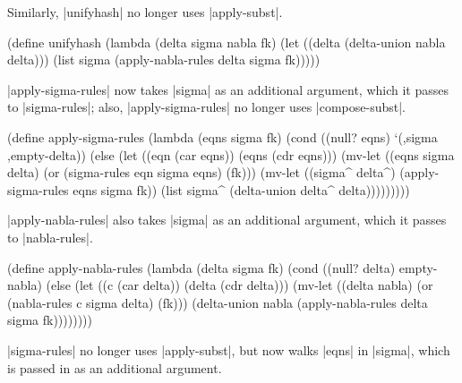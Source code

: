 Similarly, \scheme|unifyhash| no longer uses \scheme|apply-subst|.

\schemedisplayspace
\begin{schemedisplay}
(define unifyhash
  (lambda (delta sigma nabla fk)
    (let ((delta (delta-union nabla delta)))
      (list sigma (apply-nabla-rules delta sigma fk)))))
\end{schemedisplay}

\scheme|apply-sigma-rules| now takes \scheme|sigma| as an additional
argument, which it passes to \scheme|sigma-rules|; also,
\scheme|apply-sigma-rules| no longer uses \scheme|compose-subst|.

\schemedisplayspace
\begin{schemedisplay}
(define apply-sigma-rules
  (lambda (eqns sigma fk)
    (cond
      ((null? eqns) `(,sigma ,empty-delta))
      (else
       (let ((eqn (car eqns)) (eqns (cdr eqns)))
         (mv-let ((eqns sigma delta) (or (sigma-rules eqn sigma eqns) (fk)))
           (mv-let ((sigma^ delta^) (apply-sigma-rules eqns sigma fk))
             (list sigma^ (delta-union delta^ delta)))))))))
\end{schemedisplay}

\scheme|apply-nabla-rules| also takes \scheme|sigma| as an additional
argument, which it passes to \scheme|nabla-rules|.

\schemedisplayspace
\begin{schemedisplay}
(define apply-nabla-rules
  (lambda (delta sigma fk)
    (cond
      ((null? delta) empty-nabla)
      (else
       (let ((c (car delta)) (delta (cdr delta)))
         (mv-let ((delta nabla) (or (nabla-rules c sigma delta) (fk)))
           (delta-union nabla (apply-nabla-rules delta sigma fk))))))))
\end{schemedisplay}

\scheme|sigma-rules| no longer uses \scheme|apply-subst|, but now
walks \scheme|eqns| in \scheme|sigma|, which is passed in as an
additional argument.

